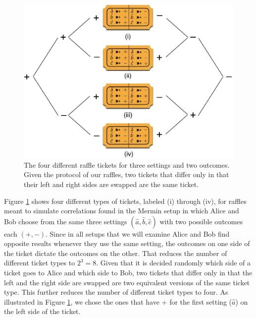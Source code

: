 \begin{figure}[ht]
 \centering
   \includegraphics[width=4.5in]{raffle-tickets-3set2out-i-thru-iv.jpeg} 
   \caption{The four different raffle tickets for three settings and two outcomes. Given the protocol of our raffles, two tickets that differ only in that their left and right sides are swapped are the same ticket.}
   \label{raffle-tickets-3set2out-i-thru-iv}
   \end{figure}

Figure \ref{raffle-tickets-3set2out-i-thru-iv} shows four different types of tickets, labeled (i) through (iv), for raffles meant to simulate correlations found in the Mermin setup in which Alice and Bob choose from the same three settings $(\hat{a}, \hat{b}, \hat{c})$ with two possible outcomes each $(+, -)$. Since in all setups that we will examine Alice and Bob find opposite results whenever they use the same setting, the outcomes on one side of the ticket dictate the outcomes on the other. That reduces the number of different ticket types to $2^3 = 8$. Given that it is decided randomly which side of a ticket goes to Alice and which side to Bob, two tickets that differ only in that the left and the right side are swapped are two equivalent versions of the same ticket type. This further reduces the number of different ticket types to four. As illustrated in Figure \ref{raffle-tickets-3set2out-i-thru-iv}, we chose the ones that have $+$ for the first setting ($\hat{a}$) on the left side of the ticket.


